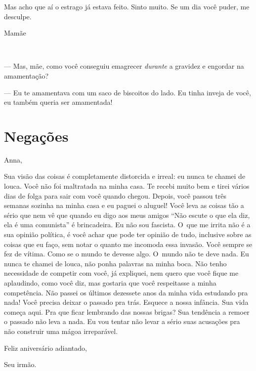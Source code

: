 Mas acho que aí o estrago já estava feito. Sinto muito. Se um dia você
puder, me desculpe.

\begin{flushright}Mamãe\end{flushright}


​\pagebreak\mbox{} 

\vspace*{.3\textheight} 

--- Mas, mãe, como você conseguiu emagrecer \emph{durante} a gravidez e
engordar na amamentação?

--- Eu te amamentava com um saco de biscoitos do lado. Eu tinha inveja
de você, eu também queria ser amamentada!

\chapter{Negações}

\vspace{-3em} 

Anna,

\smallskip{} 

Sua visão das coisas é completamente distorcida e irreal: eu nunca te
chamei de louca. Você não foi maltratada na minha casa. Te recebi muito
bem e tirei vários dias de folga para sair com você quando chegou.
Depois, você passou três semanas sozinha na minha casa e eu paguei o
aluguel! Você leva as coisas tão a sério que nem vê que quando eu digo
aos meus amigos ``Não escute o que ela diz, ela é uma comunista'' é
brincadeira. Eu não sou fascista. O~que me irrita não é a sua opinião
política, é você achar que pode ter opinião de tudo, inclusive sobre as
coisas que eu faço, sem notar o quanto me incomoda essa invasão. Você
sempre se fez de vítima. Como se o mundo te devesse algo. O~mundo não te
deve nada. Eu nunca te chamei de louca, não ponha palavras na minha
boca. Não tenho necessidade de competir com você, já expliquei, nem
quero que você fique me aplaudindo, como você diz, mas gostaria que você
respeitasse a minha competência. Não passei os últimos dezessete anos da
minha vida estudando pra nada! Você precisa deixar o passado pra trás.
Esquece a nossa infância. Sua vida começa aqui. Pra que ficar lembrando
das nossas brigas? Sua tendência a remoer o passado não leva a nada. Eu
vou tentar não levar a sério suas acusações pra não construir uma mágoa
irreparável.

\smallskip{}  \begin{flushright}Feliz aniversário adiantado,\end{flushright}
 \begin{flushright}Seu irmão.\end{flushright}


